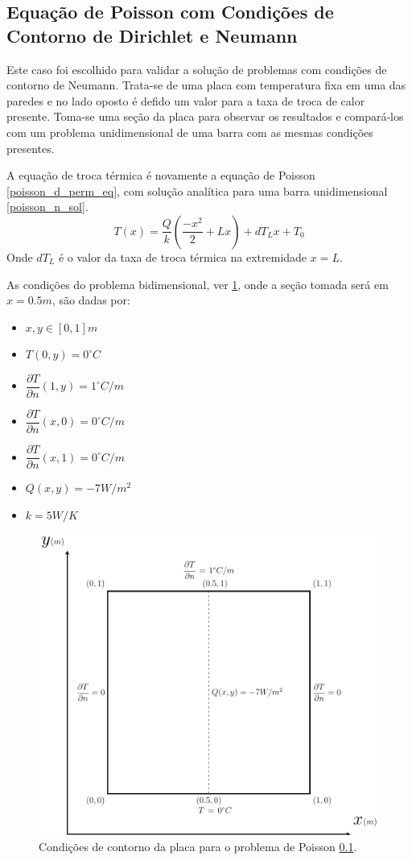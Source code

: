 \subsection{\textbf{Equação de Poisson com Condições de Contorno de Dirichlet e Neumann}}
\label{sec_poisson_neu}
Este caso foi escolhido para validar a solução de problemas com condições de contorno de Neumann.
Trata-se de uma placa com temperatura fixa em uma das paredes e no lado oposto é defido um valor para a taxa de troca de calor presente.
Toma-se uma seção da placa para observar os resultados e compará-los com um problema unidimensional de uma barra com as mesmas condições presentes.

A equação de troca térmica é novamente a equação de Poisson \ref{poisson_d_perm_eq}, com solução analítica para uma barra unidimensional \ref{poisson_n_sol}.
\begin{equation}
    T(x) = \dfrac{Q}{k}\left(\dfrac{-x^2}{2} + L x\right) + dT_L x + T_0
    \label{poisson_n_sol} 
\end{equation}
Onde $dT_L$ é o valor da taxa de troca térmica na extremidade $x=L$.

As condições do problema bidimensional, ver \ref{poisson_n_bc}, onde a seção tomada será em $x=0.5m$, são dadas por:
\begin{itemize}
    \item $x,y\in [0,1]m$
    \item $T(0,y) = 0^{\circ}C$
    \item $\dfrac{\partial T}{\partial n}(1,y) = 1^{\circ}C/m$
    \item $\dfrac{\partial T}{\partial n}(x,0) = 0^{\circ}C/m$
    \item $\dfrac{\partial T}{\partial n}(x,1) = 0^{\circ}C/m$
    \item $Q(x,y) = -7W/m^2$
    \item $k = 5W/K$
\end{itemize}

\begin{figure}[H]
    \centering
    \includegraphics[width=.7\linewidth]{figures/poisson_neumann_boundary_conditions.pdf}
    \caption{Condições de contorno da placa para o problema de Poisson \ref{sec_poisson_neu}.}
    \label{poisson_n_bc}
\end{figure}

